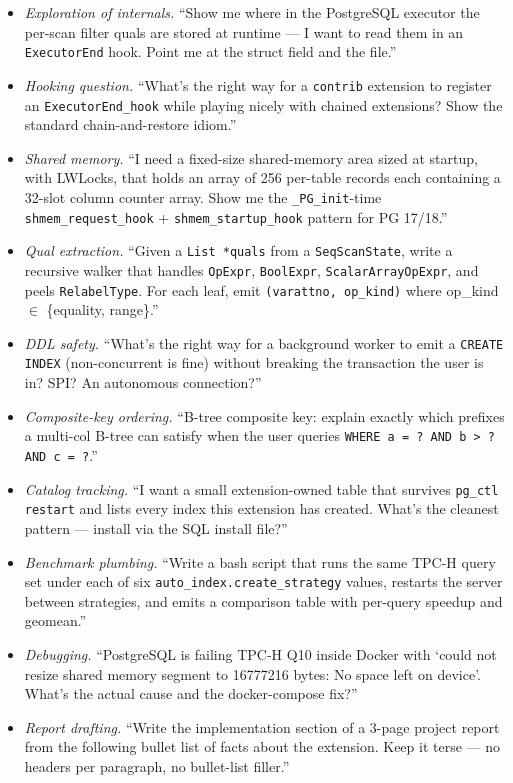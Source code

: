 \documentclass[10pt,a4paper]{article}
\newcommand{\code}[1]{\texttt{\small #1}}
\begin{document}
\begin{itemize}
\item \emph{Exploration of internals.} ``Show me where in the
PostgreSQL executor the per-scan filter quals are stored at runtime
--- I want to read them in an \code{ExecutorEnd} hook. Point me at
the struct field and the file.''
\item \emph{Hooking question.} ``What's the right way for a
\code{contrib} extension to register an \code{ExecutorEnd\_hook}
while playing nicely with chained extensions? Show the standard
chain-and-restore idiom.''
\item \emph{Shared memory.} ``I need a fixed-size shared-memory area
sized at startup, with LWLocks, that holds an array of 256
per-table records each containing a 32-slot column counter array.
Show me the \code{\_PG\_init}-time \code{shmem\_request\_hook} +
\code{shmem\_startup\_hook} pattern for PG 17/18.''
\item \emph{Qual extraction.} ``Given a \code{List *quals} from a
\code{SeqScanState}, write a recursive walker that handles
\code{OpExpr}, \code{BoolExpr}, \code{ScalarArrayOpExpr}, and peels
\code{RelabelType}. For each leaf, emit \code{(varattno, op\_kind)}
where op\_kind $\in$ \{equality, range\}.''
\item \emph{DDL safety.} ``What's the right way for a background
worker to emit a \code{CREATE INDEX} (non-concurrent is fine)
without breaking the transaction the user is in? SPI? An autonomous
connection?''
\item \emph{Composite-key ordering.} ``B-tree composite key: explain
exactly which prefixes a multi-col B-tree can satisfy when the user
queries \code{WHERE a = ? AND b > ? AND c = ?}.''
\item \emph{Catalog tracking.} ``I want a small extension-owned
table that survives \code{pg\_ctl restart} and lists every index
this extension has created. What's the cleanest pattern --- install
via the SQL install file?''
\item \emph{Benchmark plumbing.} ``Write a bash script that runs the
same TPC-H query set under each of six \code{auto\_index.create\_strategy}
values, restarts the server between strategies, and emits a
comparison table with per-query speedup and geomean.''
\item \emph{Debugging.} ``PostgreSQL is failing TPC-H Q10 inside
Docker with `could not resize shared memory segment to 16777216
bytes: No space left on device'. What's the actual cause and the
docker-compose fix?''
\item \emph{Report drafting.} ``Write the implementation section of
a 3-page project report from the following bullet list of facts
about the extension. Keep it terse --- no headers per paragraph,
no bullet-list filler.''
\end{itemize}
\end{document}
